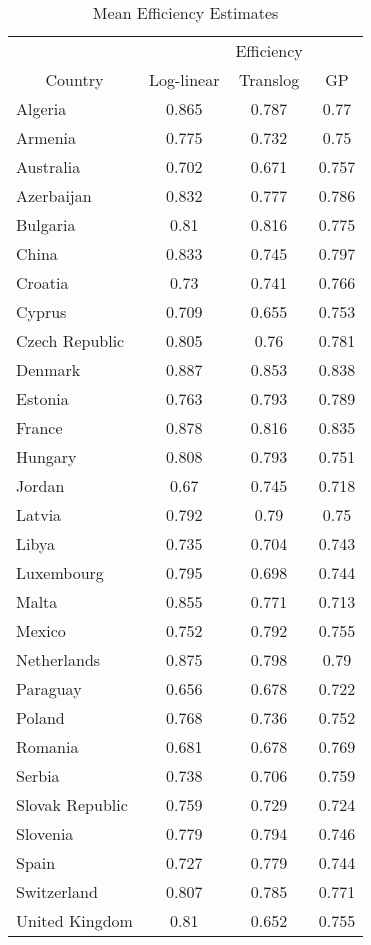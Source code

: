 \begin{table*}
\centering
\begin{tabular}{l|c|c|c}
  \multicolumn{1}{c}{} & \multicolumn{1}{c}{} & \multicolumn{1}{c}{Efficiency} & \multicolumn{1}{c}{} \\ 
   \cline{2-4}\multicolumn{1}{c}{Country} & \multicolumn{1}{c}{Log-linear} & \multicolumn{1}{c}{Translog} & \multicolumn{1}{c}{GP} \\ 
   \hline
\hline
Algeria & 0.865 & 0.787 & 0.77 \\ 
  Armenia & 0.775 & 0.732 & 0.75 \\ 
  Australia & 0.702 & 0.671 & 0.757 \\ 
  Azerbaijan & 0.832 & 0.777 & 0.786 \\ 
  Bulgaria & 0.81 & 0.816 & 0.775 \\ 
  China & 0.833 & 0.745 & 0.797 \\ 
  Croatia & 0.73 & 0.741 & 0.766 \\ 
  Cyprus & 0.709 & 0.655 & 0.753 \\ 
  Czech Republic & 0.805 & 0.76 & 0.781 \\ 
  Denmark & 0.887 & 0.853 & 0.838 \\ 
  Estonia & 0.763 & 0.793 & 0.789 \\ 
  France & 0.878 & 0.816 & 0.835 \\ 
  Hungary & 0.808 & 0.793 & 0.751 \\ 
  Jordan & 0.67 & 0.745 & 0.718 \\ 
  Latvia & 0.792 & 0.79 & 0.75 \\ 
  Libya & 0.735 & 0.704 & 0.743 \\ 
  Luxembourg & 0.795 & 0.698 & 0.744 \\ 
  Malta & 0.855 & 0.771 & 0.713 \\ 
  Mexico & 0.752 & 0.792 & 0.755 \\ 
  Netherlands & 0.875 & 0.798 & 0.79 \\ 
  Paraguay & 0.656 & 0.678 & 0.722 \\ 
  Poland & 0.768 & 0.736 & 0.752 \\ 
  Romania & 0.681 & 0.678 & 0.769 \\ 
  Serbia & 0.738 & 0.706 & 0.759 \\ 
  Slovak Republic & 0.759 & 0.729 & 0.724 \\ 
  Slovenia & 0.779 & 0.794 & 0.746 \\ 
  Spain & 0.727 & 0.779 & 0.744 \\ 
  Switzerland & 0.807 & 0.785 & 0.771 \\ 
  United Kingdom & 0.81 & 0.652 & 0.755 \\ 
   \hline
\end{tabular}
\caption{Mean Efficiency Estimates} 
\label{tab:EfficiencyEstimates}
\end{table*}

